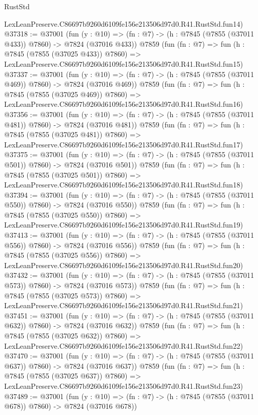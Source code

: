 \begin{lexlean}{RustStd}
\begin{coremodule}
    LexLeanPreserve.C86697b9260d6109fe156e213506d97d0.R41.RustStd.fun14)
@37318 := @37001
    (fun (y : @10) => (fn : @7) -> (h : @7845 (@7855 (@37011 @433)) @7860) -> @7824 (@37016 @433))
    @7859
    (fun (fn : @7) =>
    fun (h : @7845 (@7855 (@37025 @433)) @7860) =>
    LexLeanPreserve.C86697b9260d6109fe156e213506d97d0.R41.RustStd.fun15)
@37337 := @37001
    (fun (y : @10) => (fn : @7) -> (h : @7845 (@7855 (@37011 @469)) @7860) -> @7824 (@37016 @469))
    @7859
    (fun (fn : @7) =>
    fun (h : @7845 (@7855 (@37025 @469)) @7860) =>
    LexLeanPreserve.C86697b9260d6109fe156e213506d97d0.R41.RustStd.fun16)
@37356 := @37001
    (fun (y : @10) => (fn : @7) -> (h : @7845 (@7855 (@37011 @481)) @7860) -> @7824 (@37016 @481))
    @7859
    (fun (fn : @7) =>
    fun (h : @7845 (@7855 (@37025 @481)) @7860) =>
    LexLeanPreserve.C86697b9260d6109fe156e213506d97d0.R41.RustStd.fun17)
@37375 := @37001
    (fun (y : @10) => (fn : @7) -> (h : @7845 (@7855 (@37011 @501)) @7860) -> @7824 (@37016 @501))
    @7859
    (fun (fn : @7) =>
    fun (h : @7845 (@7855 (@37025 @501)) @7860) =>
    LexLeanPreserve.C86697b9260d6109fe156e213506d97d0.R41.RustStd.fun18)
@37394 := @37001
    (fun (y : @10) => (fn : @7) -> (h : @7845 (@7855 (@37011 @550)) @7860) -> @7824 (@37016 @550))
    @7859
    (fun (fn : @7) =>
    fun (h : @7845 (@7855 (@37025 @550)) @7860) =>
    LexLeanPreserve.C86697b9260d6109fe156e213506d97d0.R41.RustStd.fun19)
@37413 := @37001
    (fun (y : @10) => (fn : @7) -> (h : @7845 (@7855 (@37011 @556)) @7860) -> @7824 (@37016 @556))
    @7859
    (fun (fn : @7) =>
    fun (h : @7845 (@7855 (@37025 @556)) @7860) =>
    LexLeanPreserve.C86697b9260d6109fe156e213506d97d0.R41.RustStd.fun20)
@37432 := @37001
    (fun (y : @10) => (fn : @7) -> (h : @7845 (@7855 (@37011 @573)) @7860) -> @7824 (@37016 @573))
    @7859
    (fun (fn : @7) =>
    fun (h : @7845 (@7855 (@37025 @573)) @7860) =>
    LexLeanPreserve.C86697b9260d6109fe156e213506d97d0.R41.RustStd.fun21)
@37451 := @37001
    (fun (y : @10) => (fn : @7) -> (h : @7845 (@7855 (@37011 @632)) @7860) -> @7824 (@37016 @632))
    @7859
    (fun (fn : @7) =>
    fun (h : @7845 (@7855 (@37025 @632)) @7860) =>
    LexLeanPreserve.C86697b9260d6109fe156e213506d97d0.R41.RustStd.fun22)
@37470 := @37001
    (fun (y : @10) => (fn : @7) -> (h : @7845 (@7855 (@37011 @637)) @7860) -> @7824 (@37016 @637))
    @7859
    (fun (fn : @7) =>
    fun (h : @7845 (@7855 (@37025 @637)) @7860) =>
    LexLeanPreserve.C86697b9260d6109fe156e213506d97d0.R41.RustStd.fun23)
@37489 := @37001
    (fun (y : @10) => (fn : @7) -> (h : @7845 (@7855 (@37011 @678)) @7860) -> @7824 (@37016 @678))

\end{coremodule}
\end{lexlean}
